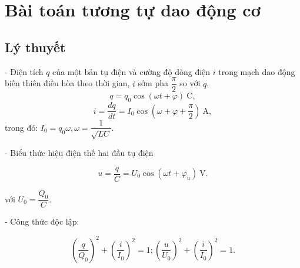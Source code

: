 \let\lesson\undefined
\newcommand{\lesson}{\phantomlesson{Bài 20: Mạch dao động}}
\chapter[ Bài toán tương tự dao động cơ]{ Bài toán tương tự dao động cơ}
\section{Lý thuyết}
- Điện tích $q$ của một bản tụ điện và cường độ dòng điện $i$ trong mạch dao động biến thiên điều hòa theo thời gian, $i$ sớm pha $\dfrac{\pi}{2} $ so với $q$.
\begin{equation}
	q=q_0\cos(\omega t +\varphi)\ \text{C}, 
\end{equation}
\begin{equation}
	i=\frac{dq}{dt}=I_0 \cos(\omega +\varphi+ \frac{\pi}{2})\ \text{A},
\end{equation}
trong đó: $I_0=q_0\omega, \omega =\dfrac{1}{\sqrt {LC}}$.

- Biểu thức hiệu điện thế hai đầu tụ điện

$$ u = \dfrac{q}{C} = U_0 \cos (\omega t + \varphi_u)\ \text{V}.$$

với $U_0 =\dfrac{Q_0}{C}.$

- Công thức độc lập:

$$ \left(\dfrac{q}{Q_0}\right)^2 +  \left(\dfrac{i}{I_0}\right)^2 =1; \left(\dfrac{u}{U_0}\right)^2 +  \left(\dfrac{i}{I_0}\right)^2 =1.$$


